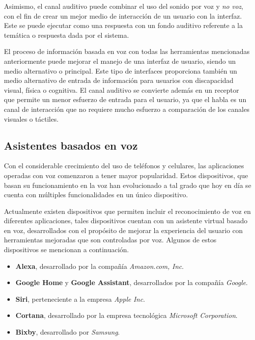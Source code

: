 Asimismo, el canal auditivo puede combinar el uso del sonido por voz y \textit{no voz}, con el fin de crear un mejor medio de interacción de un usuario con la interfaz. Este se puede ejecutar como una respuesta con un fondo auditivo referente a la temática o respuesta dada por el sistema.

El proceso de información basada en voz con todas las herramientas mencionadas anteriormente puede mejorar el manejo de una interfaz de usuario, siendo un medio alternativo o principal. Este tipo de interfaces proporciona también un medio alternativo de entrada de información para usuarios con discapacidad visual, física o cognitiva. El canal auditivo se convierte además en un receptor que permite un menor esfuerzo de entrada para el usuario, ya que el habla es un canal de interacción que no requiere mucho esfuerzo a comparación de los canales visuales o táctiles.


\subsection{Asistentes basados en voz}
\label{AsistentesBasadosVozCap3}

Con el considerable crecimiento del uso de teléfonos y celulares, las aplicaciones operadas con voz comenzaron a tener mayor popularidad. Estos dispositivos, que basan su funcionamiento en la voz han evolucionado a tal grado que hoy en día se cuenta con múltiples funcionalidades en un único dispositivo.

Actualmente existen dispositivos que permiten incluir el reconocimiento de voz en diferentes aplicaciones, tales dispositivos cuentan con un asistente virtual basado en voz, desarrollados con el propósito de mejorar la experiencia del usuario con herramientas mejoradas que son controladas por voz. Algunos de estos dispositivos se mencionan a continuación.

\begin{itemize}
  \item \textbf{Alexa}, desarrollado por la compañía \textit{Amazon.com, Inc}.
  \item \textbf{Google Home} y \textbf{Google Assistant}, desarrollados por la compañía \textit{Google}.
  \item \textbf{Siri}, perteneciente a la empresa \textit{Apple Inc}.
  \item \textbf{Cortana}, desarrollado por la empresa tecnológica \textit{Microsoft Corporation}.
  \item \textbf{Bixby}, desarrollado por \textit{Samsung}.
\end{itemize}

